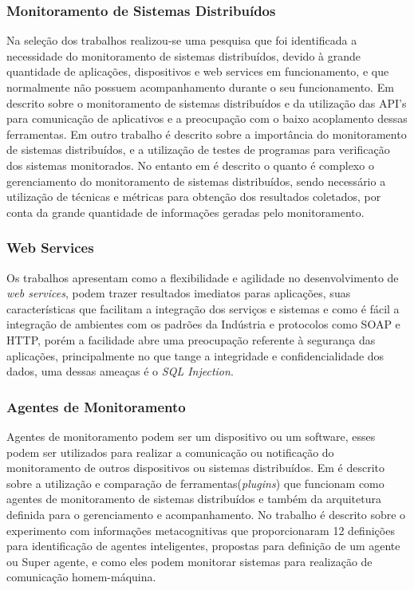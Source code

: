\subsubsection{Monitoramento de Sistemas Distribuídos}
Na seleção dos trabalhos realizou-se uma pesquisa que foi identificada a necessidade do monitoramento de sistemas distribuídos, devido à grande quantidade de  aplicações, dispositivos e web services em funcionamento, e que normalmente não possuem acompanhamento durante o seu funcionamento. Em \cite{cirstoiu2007monitoring} descrito sobre o monitoramento de sistemas distribuídos e da utilização das API's para comunicação de aplicativos e a preocupação com o baixo acoplamento dessas ferramentas. Em outro trabalho \cite{joyce1987monitoring} é descrito sobre a importância do monitoramento de sistemas distribuídos, e a utilização de testes de programas para verificação dos sistemas monitorados. No entanto em \cite{abdu1996monitoring} é descrito o quanto é complexo o gerenciamento do monitoramento de sistemas distribuídos, sendo necessário a utilização de técnicas e métricas para obtenção dos resultados coletados, por conta da grande quantidade de informações geradas pelo monitoramento.  

\subsubsection{Web Services}

Os trabalhos \cite{patil2012remote,casola2009sensim} apresentam como a flexibilidade e agilidade no desenvolvimento de \textit{web services}, podem trazer resultados imediatos paras aplicações, suas características que facilitam a integração dos serviços e sistemas e como é fácil a integração de ambientes com os padrões da Indústria e protocolos como SOAP e HTTP, porém a facilidade abre uma preocupação referente à segurança das aplicações, principalmente no que tange a integridade e confidencialidade dos dados, uma dessas ameaças é o \textit{SQL Injection}. 

\subsubsection{Agentes de Monitoramento}

Agentes de monitoramento podem ser um dispositivo ou um software, esses podem ser utilizados para realizar a comunicação ou notificação do monitoramento de outros dispositivos ou sistemas distribuídos. Em \cite{smith2008flexible} é descrito sobre a utilização e comparação de ferramentas(\textit{plugins}) que funcionam como agentes de monitoramento de sistemas distribuídos e também da arquitetura definida para o gerenciamento e acompanhamento. No trabalho \cite{puatruct2010agent} é descrito sobre o experimento com informações metacognitivas que proporcionaram 12 definições para identificação de agentes inteligentes, propostas para definição de um agente ou Super agente, e como eles podem monitorar sistemas para realização de comunicação homem-máquina.

